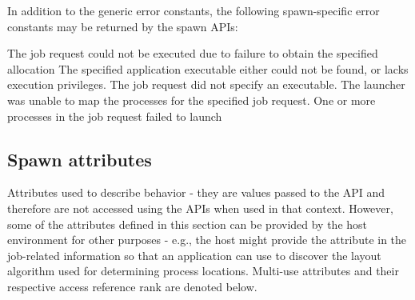 In addition to the generic error constants, the following spawn-specific error constants may be returned by the spawn \acp{API}:

\begin{constantdesc}

%
The job request could not be executed due to failure to obtain the specified allocation
%
The specified application executable either could not be found, or lacks execution privileges.
%
The job request did not specify an executable.
%
The launcher was unable to map the processes for the specified job request.
%
One or more processes in the job request failed to launch
%

\end{constantdesc}

\subsection{Spawn attributes}
\label{api:struct:attributes:spawn}

Attributes used to describe  behavior - they are values passed to the  \ac{API} and therefore are not accessed using the  \acp{API} when used in that context. However, some of the attributes defined in this section can be provided by the host environment for other purposes - e.g., the host might provide the  attribute in the job-related information so that an application can use  to discover the layout algorithm used for determining process locations. Multi-use attributes and their respective access reference rank are denoted below.

%

%

%

%


